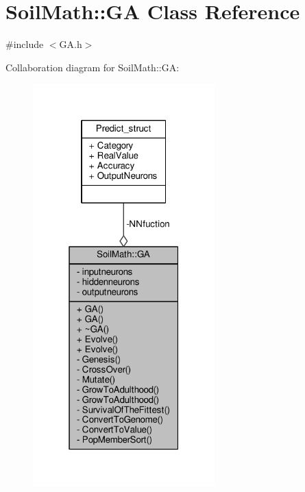 \hypertarget{class_soil_math_1_1_g_a}{}\section{Soil\+Math\+:\+:G\+A Class Reference}
\label{class_soil_math_1_1_g_a}


{\ttfamily \#include $<$G\+A.\+h$>$}



Collaboration diagram for Soil\+Math\+:\+:G\+A\+:\nopagebreak
\begin{figure}[H]
\begin{center}
\leavevmode
\includegraphics[width=199pt]{class_soil_math_1_1_g_a__coll__graph}
\end{center}
\end{figure}
